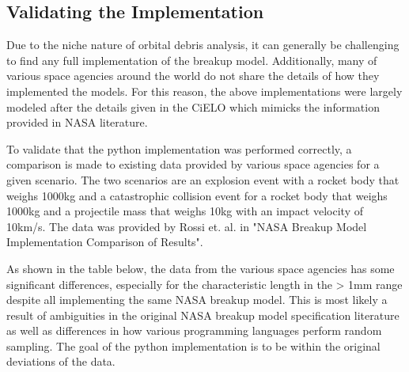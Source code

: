 \documentclass{article}
\begin{document}
\newpage
\subsection{Validating the Implementation}
Due to the niche nature of orbital debris analysis, it can generally be challenging to find any full implementation of the breakup model. Additionally, many of various space agencies around the world do not share the details of how they implemented the models. For this reason, the above implementations were largely modeled after the details given in the CiELO \cite{letizia_space_2016} which mimicks the information provided in NASA literature.

To validate that the python implementation was performed correctly, a comparison is made to existing data provided by various space agencies for a given scenario. The two scenarios are an explosion event with a rocket body that weighs 1000kg and a catastrophic collision event for a rocket body that weighs 1000kg and a projectile mass that weighs 10kg with an impact velocity of 10km/s. The data was provided by Rossi et. al. in "NASA Breakup Model Implementation Comparison of Results"\citep{rossi_nasa_nodate}.

As shown in the table below, the data from the various space agencies has some significant differences, especially for the characteristic length in the > 1mm range despite all implementing the same NASA breakup model. This is most likely a result of ambiguities in the original NASA breakup model specification literature as well as differences in how various programming languages perform random sampling. The goal of the python implementation is to be within the original deviations of the data.
\end{document}

